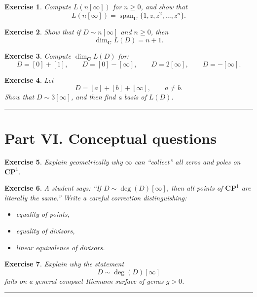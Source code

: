 \documentclass[11pt]{article}
\newtheorem{exercise}{Exercise}
\newcommand{\CP}{\mathbf{CP}^1}
\newcommand{\C}{\mathbf{C}}
\begin{document}
	\begin{exercise}
		Compute \(L(n[\infty])\) for \(n\ge 0\), and show that
		\[
		L(n[\infty])=\operatorname{span}_{\C}\{1,z,z^2,\dots,z^n\}.
		\]
	\end{exercise}
	
	\begin{exercise}
		Show that if \(D\sim n[\infty]\) and \(n\ge 0\), then
		\[
		\dim_\C L(D)=n+1.
		\]
	\end{exercise}
	
	\begin{exercise}
		Compute \(\dim_\C L(D)\) for:
		\[
		D=[0]+[1], \qquad D=[0]-[\infty], \qquad D=2[\infty], \qquad D=-[\infty].
		\]
	\end{exercise}
	
	\begin{exercise}
		Let
		\[
		D=[a]+[b]+[\infty], \qquad a\neq b.
		\]
		Show that \(D\sim 3[\infty]\), and then find a basis of \(L(D)\).
	\end{exercise}
	
	\hrule
	\bigskip
	
	\section*{Part VI. Conceptual questions}
	
	\begin{exercise}
		Explain geometrically why \(\infty\) can ``collect'' all zeros and poles on \(\CP\).
	\end{exercise}
	
	\begin{exercise}
		A student says: ``If \(D\sim \deg(D)[\infty]\), then all points of \(\CP\) are literally the same.''  
		Write a careful correction distinguishing:
		\begin{itemize}[topsep=0.2em]
			\item equality of points,
			\item equality of divisors,
			\item linear equivalence of divisors.
		\end{itemize}
	\end{exercise}
	
	\begin{exercise}
		Explain why the statement
		\[
		D\sim \deg(D)[\infty]
		\]
		fails on a general compact Riemann surface of genus \(g>0\).
	\end{exercise}
	
	\hrule
	\bigskip
	
\end{document}
